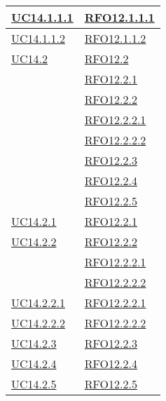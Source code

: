\begin{longtable}{|>{\centering}m{5cm}|m{5cm}<{\centering}|}
\hyperlink{UC14.1.1.1}{UC14.1.1.1} & \hyperlink{RFO12.1.1.1}{RFO12.1.1.1}\\\hline
\hyperlink{UC14.1.1.2}{UC14.1.1.2} & \hyperlink{RFO12.1.1.2}{RFO12.1.1.2}\\\hline
\hyperlink{UC14.2}{UC14.2} & \hyperlink{RFO12.2}{RFO12.2}\\
& \hyperlink{RFO12.2.1}{RFO12.2.1}\\
& \hyperlink{RFO12.2.2}{RFO12.2.2}\\
& \hyperlink{RFO12.2.2.1}{RFO12.2.2.1}\\
& \hyperlink{RFO12.2.2.2}{RFO12.2.2.2}\\
& \hyperlink{RFO12.2.3}{RFO12.2.3}\\
& \hyperlink{RFO12.2.4}{RFO12.2.4}\\
& \hyperlink{RFO12.2.5}{RFO12.2.5}\\\hline
\hyperlink{UC14.2.1}{UC14.2.1} & \hyperlink{RFO12.2.1}{RFO12.2.1}\\\hline
\hyperlink{UC14.2.2}{UC14.2.2} & \hyperlink{RFO12.2.2}{RFO12.2.2}\\
& \hyperlink{RFO12.2.2.1}{RFO12.2.2.1}\\
& \hyperlink{RFO12.2.2.2}{RFO12.2.2.2}\\\hline
\hyperlink{UC14.2.2.1}{UC14.2.2.1} & \hyperlink{RFO12.2.2.1}{RFO12.2.2.1}\\\hline
\hyperlink{UC14.2.2.2}{UC14.2.2.2} & \hyperlink{RFO12.2.2.2}{RFO12.2.2.2}\\\hline
\hyperlink{UC14.2.3}{UC14.2.3} & \hyperlink{RFO12.2.3}{RFO12.2.3}\\\hline
\hyperlink{UC14.2.4}{UC14.2.4} & \hyperlink{RFO12.2.4}{RFO12.2.4}\\\hline
\hyperlink{UC14.2.5}{UC14.2.5} & \hyperlink{RFO12.2.5}{RFO12.2.5}\\\hline
\end{longtable}